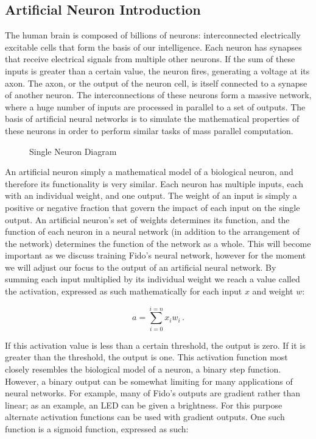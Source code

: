 \subsection{Artificial Neuron Introduction}


The human brain is composed of billions of neurons: interconnected electrically excitable cells that form the basis of our intelligence.  Each neuron has synapses that receive electrical signals from multiple other neurons.  If the sum of these inputs is greater than a certain value, the neuron fires, generating a voltage at its axon.  The axon, or the output of the neuron cell, is itself connected to a synapse of another neuron.  The interconnections of these neurons form a massive network, where a huge number of inputs are processed in parallel to a set of outputs.  The basis of artificial neural networks is to simulate the mathematical properties of these neurons in order to perform similar tasks of mass parallel computation.

\begin{figure}[ht]
	\centering
	
	\caption{Single Neuron Diagram}
\end{figure}

An artificial neuron simply a mathematical model of a biological neuron, and therefore its functionality is very similar.  Each neuron has multiple inputs, each with an individual weight, and one output.  The weight of an input is simply a positive or negative fraction that govern the impact of each input on the single output.  An artificial neuron's set of weights determines its function, and the function of each neuron in a neural network (in addition to the arrangement of the network) determines the function of the network as a whole.  This will become important as we discuss training Fido's neural network, however for the moment we will adjust our focus to the output of an artificial neural network.  By summing each input multiplied by its individual weight we reach a value called the activation, expressed as such mathematically for each input $x$ and weight $w$:

\begin{equation}
	a=\sum_{i=0}^{i=n}x_i w_i
	\,.
\end{equation}

If this activation value is less than a certain threshold, the output is zero.  If it is greater than the threshold, the output is one.  This activation function most closely resembles the biological model of a neuron, a binary step function.  However, a binary output can be somewhat limiting for many applications of neural networks.  For example, many of Fido's outputs are gradient rather than linear; as an example, an LED can be given a brightness.  For this purpose alternate activation functions can be used with gradient outputs.  One such function is a sigmoid function, expressed as such:

